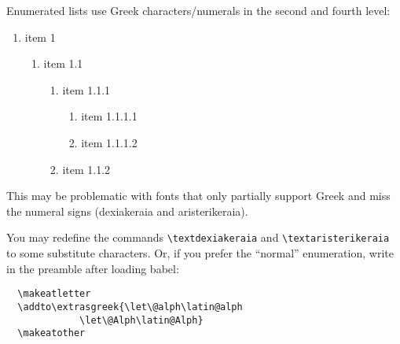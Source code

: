 \documentclass[a4paper]{article}
\begin{document}
Enumerated lists use Greek characters/numerals in the second and fourth level:

\begin{enumerate}
  \item item 1
  \begin{enumerate}
    \item item 1.1
    \begin{enumerate}
      \item item 1.1.1
       \begin{enumerate}
         \item item 1.1.1.1
         \item item 1.1.1.2
       \end{enumerate}
      \item item 1.1.2
    \end{enumerate}
  \end{enumerate}
\end{enumerate}


This may be problematic with fonts that only partially support Greek and
miss the numeral signs (dexiakeraia and aristerikeraia).

You may redefine the commands \verb+\textdexiakeraia+ and
\verb+\textaristerikeraia+ to some substitute characters.
Or, if you prefer the ``normal'' enumeration, write in the preamble after
loading babel:

\begin{verbatim}
  \makeatletter
  \addto\extrasgreek{\let\@alph\latin@alph
  		     \let\@Alph\latin@Alph}
  \makeatother
\end{verbatim}
\end{document}
